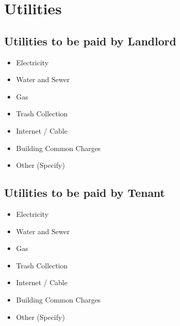 
\section{Utilities}
\label{sec:utilities}

\subsection{Utilities to be paid by Landlord}
\label{sec:utilitiesforlandlord}

\begin{itemize}
  \item[$\square$] Electricity
  \item[$\square$] Water and Sewer
  \item[$\square$] Gas
  \item[$\square$] Trash Collection
  \item[$\square$] Internet / Cable
  \item[$\square$] Building Common Charges
  \item[$\square$] Other (Specify)
\end{itemize}

\subsection{Utilities to be paid by Tenant}
\label{sec:utilitiesfortenant}

\begin{itemize}
  \item[$\square$] Electricity
  \item[$\square$] Water and Sewer
  \item[$\square$] Gas
  \item[$\square$] Trash Collection
  \item[$\square$] Internet / Cable
  \item[$\square$] Building Common Charges
  \item[$\square$] Other (Specify)
\end{itemize}

